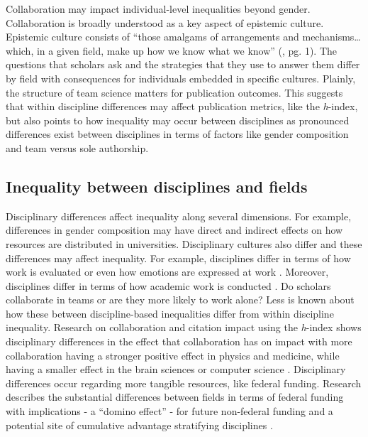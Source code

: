 \documentclass[
  10pt,
  letterpaper,
]{article}
\begin{document}
Collaboration may impact individual-level inequalities beyond gender.
Collaboration is broadly understood as a key aspect of epistemic
culture. Epistemic culture consists of ``those amalgams of arrangements
and mechanisms\ldots which, in a given field, make up how we know what
we know'' (\citep{cetina_epistemic_1999}, pg. 1). The questions that
scholars ask and the strategies that they use to answer them differ by
field with consequences for individuals embedded in specific cultures.
Plainly, the structure of team science matters for publication outcomes.
This suggests that within discipline differences may affect publication
metrics, like the \emph{h}-index, but also points to how inequality may
occur between disciplines as pronounced differences exist between
disciplines in terms of factors like gender composition and team versus
sole authorship.

\hypertarget{inequality-between-disciplines-and-fields}{%
\subsection{Inequality between disciplines and
fields}\label{inequality-between-disciplines-and-fields}}

Disciplinary differences affect inequality along several dimensions. For
example, differences in gender composition may have direct and indirect
effects on how resources are distributed in universities. Disciplinary
cultures also differ and these differences may affect inequality. For
example, disciplines differ in terms of how work is evaluated
\citep{lamont_how_2009} or even how emotions are expressed at work
\citep{koppman_joy_2015}. Moreover, disciplines differ in terms of how
academic work is conducted \citep{huang_historical_2020}. Do scholars
collaborate in teams or are they more likely to work alone? Less is
known about how these between discipline-based inequalities differ from
within discipline inequality. Research on collaboration and citation
impact using the \emph{h}-index shows disciplinary differences in the
effect that collaboration has on impact with more collaboration having a
stronger positive effect in physics and medicine, while having a smaller
effect in the brain sciences or computer science
\citep{parish_dynamics_2018}. Disciplinary differences occur regarding
more tangible resources, like federal funding. Research describes the
substantial differences between fields in terms of federal funding with
implications - a ``domino effect'' - for future non-federal funding and
a potential site of cumulative advantage stratifying disciplines
\citep{lanahan_domino_2016, lynn_15_2021}.
\end{document}
